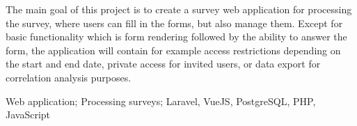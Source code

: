 \vspace{18pt}


\noindent
The main goal of this project is to create a survey web application for processing the survey, where users can fill in the forms, but also manage them. Except for basic functionality which is form rendering followed by the ability to answer the form, the application will contain for example access restrictions depending on the start and end date, private access for invited users, or data export for correlation analysis purposes.

\vspace{18pt}


\noindent Web application; Processing surveys; Laravel, VueJS, PostgreSQL, PHP, JavaScript

\cleardoublepage

\tableofcontents

\cleardoublepage